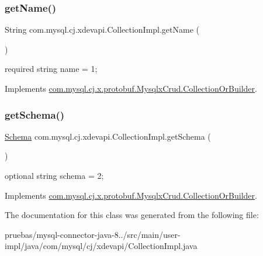 \subsubsection{\texorpdfstring{get\+Name()}{getName()}}
{\footnotesize\ttfamily String com.\+mysql.\+cj.\+xdevapi.\+Collection\+Impl.\+get\+Name (\begin{DoxyParamCaption}{ }\end{DoxyParamCaption})}

{\ttfamily required string name = 1;} 

Implements \mbox{\hyperlink{interfacecom_1_1mysql_1_1cj_1_1x_1_1protobuf_1_1_mysqlx_crud_1_1_collection_or_builder_a805acaf3cbefd4d9de9793f232aa6c8f}{com.\+mysql.\+cj.\+x.\+protobuf.\+Mysqlx\+Crud.\+Collection\+Or\+Builder}}.

\mbox{\label{classcom_1_1mysql_1_1cj_1_1xdevapi_1_1_collection_impl_a742cc33a72a7d2c8c8c88d0a5be7bc14}} 
\subsubsection{\texorpdfstring{get\+Schema()}{getSchema()}}
{\footnotesize\ttfamily \mbox{\hyperlink{interfacecom_1_1mysql_1_1cj_1_1xdevapi_1_1_schema}{Schema}} com.\+mysql.\+cj.\+xdevapi.\+Collection\+Impl.\+get\+Schema (\begin{DoxyParamCaption}{ }\end{DoxyParamCaption})}

{\ttfamily optional string schema = 2;} 

Implements \mbox{\hyperlink{interfacecom_1_1mysql_1_1cj_1_1x_1_1protobuf_1_1_mysqlx_crud_1_1_collection_or_builder_ab0b6bd32b4e0aa8766d5524d36027bf8}{com.\+mysql.\+cj.\+x.\+protobuf.\+Mysqlx\+Crud.\+Collection\+Or\+Builder}}.



The documentation for this class was generated from the following file\+:\begin{DoxyCompactItemize}
\item 
pruebas/mysql-\/connector-\/java-\/8../src/main/user-\/impl/java/com/mysql/cj/xdevapi/Collection\+Impl.\+java\end{DoxyCompactItemize}
